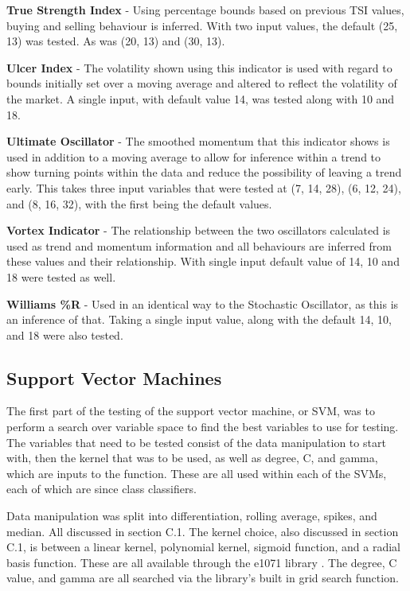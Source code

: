 \documentclass[conference]{IEEEtran}
\begin{document}
\textbf{True Strength Index} - Using percentage bounds based on previous TSI values, buying and selling behaviour is inferred. With two input values, the default (25, 13) was tested. As was (20, 13) and (30, 13).

\textbf{Ulcer Index} - The volatility shown using this indicator is used with regard to bounds initially set over a moving average and altered to reflect the volatility of the market. A single input, with default value 14, was tested along with 10 and 18.

\textbf{Ultimate Oscillator} - The smoothed momentum that this indicator shows is used in addition to a moving average to allow for inference within a trend to show turning points within the data and reduce the possibility of leaving a trend early. This takes three input variables that were tested at (7, 14, 28), (6, 12, 24), and (8, 16, 32), with the first being the default values.

\textbf{Vortex Indicator} - The relationship between the two oscillators calculated is used as trend and momentum information and all behaviours are inferred from these values and their relationship. With single input default value of 14, 10 and 18 were tested as well.

\textbf{Williams \%R} - Used in an identical way to the Stochastic Oscillator, as this is an inference of that. Taking a single input value, along with the default 14, 10, and 18 were also tested.

\subsection{Support Vector Machines}

The first part of the testing of the support vector machine, or SVM, was to perform a search over variable space to find the best variables to use for testing. The variables that need to be tested consist of the data manipulation to start with, then the kernel that was to be used, as well as degree, C, and gamma, which are inputs to the function. These are all used within each of the SVMs, each of which are since class classifiers. 

Data manipulation was split into differentiation, rolling average, spikes, and median. All discussed in section C.1. The kernel choice, also discussed in section C.1, is between a linear kernel, polynomial kernel, sigmoid function, and a radial basis function. These are all available through the e1071 library \cite{Meyer2017}. The degree, C value, and gamma are all searched via the library's built in grid search function. 
\end{document}
